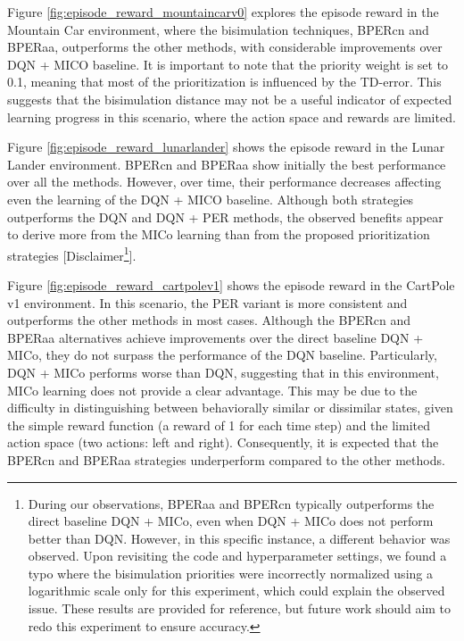 Figure \ref{fig:episode_reward_mountaincarv0} explores the episode reward in the Mountain Car environment, where the bisimulation techniques, BPERcn and BPERaa, outperforms the other methods, with considerable improvements over DQN + MICO baseline. It is important to note that the priority weight is set to 0.1, meaning that most of the prioritization is influenced by the TD-error. This suggests that the bisimulation distance may not be a useful indicator of expected learning progress in this scenario, where the action space and rewards are limited.

Figure \ref{fig:episode_reward_lunarlander} shows the episode reward in the Lunar Lander environment. BPERcn and BPERaa show initially the best performance over all the methods. However, over time, their performance decreases affecting even the learning of the DQN + MICO baseline. Although both strategies outperforms the DQN and DQN + PER methods, the observed benefits appear to derive more from the MICo learning than from the proposed prioritization strategies [Disclaimer\footnote{During our observations, BPERaa and BPERcn typically outperforms the direct baseline DQN + MICo, even when DQN + MICo does not perform better than DQN. However, in this specific instance, a different behavior was observed. Upon revisiting the code and hyperparameter settings, we found a typo where the bisimulation priorities were incorrectly normalized using a logarithmic scale only for this experiment, which could explain the observed issue. These results are provided for reference, but future work should aim to redo this experiment to ensure accuracy.}].

Figure \ref{fig:episode_reward_cartpolev1} shows the episode reward in the CartPole v1 environment. In this scenario, the PER variant is more consistent and outperforms the other methods in most cases. Although the BPERcn and BPERaa alternatives achieve improvements over the direct baseline DQN + MICo, they do not surpass the performance of the DQN baseline. Particularly, DQN + MICo performs worse than DQN, suggesting that in this environment, MICo learning does not provide a clear advantage. This may be due to the difficulty in distinguishing between behaviorally similar or dissimilar states, given the simple reward function (a reward of 1 for each time step) and the limited action space (two actions: left and right). Consequently, it is expected that the BPERcn and BPERaa strategies underperform compared to the other methods. 


